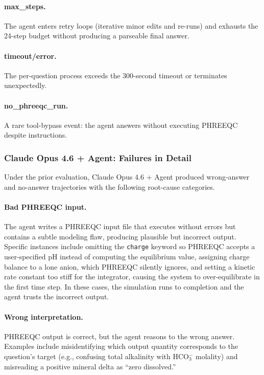 \documentclass{article}
\begin{document}
\paragraph{max\_steps.}
The agent enters retry loops (iterative minor edits and re-runs) and exhausts the 24-step budget without producing a parseable final answer.

\paragraph{timeout/error.}
The per-question process exceeds the 300-second timeout or terminates unexpectedly.

\paragraph{no\_phreeqc\_run.}
A rare tool-bypass event: the agent answers without executing PHREEQC despite instructions.

\subsubsection{Claude Opus 4.6 + Agent: Failures in Detail}

Under the prior evaluation, Claude Opus 4.6 + Agent produced wrong-answer and no-answer trajectories with the following root-cause categories.

\paragraph{Bad PHREEQC input.}
The agent writes a PHREEQC input file that executes without errors but contains a subtle modeling flaw, producing plausible but incorrect output. Specific instances include omitting the \texttt{charge} keyword so PHREEQC accepts a user-specified pH instead of computing the equilibrium value, assigning charge balance to a lone anion, which PHREEQC silently ignores, and setting a kinetic rate constant too stiff for the integrator, causing the system to over-equilibrate in the first time step. In these cases, the simulation runs to completion and the agent trusts the incorrect output.

\paragraph{Wrong interpretation.}
PHREEQC output is correct, but the agent reasons to the wrong answer. Examples include misidentifying which output quantity corresponds to the question's target (e.g., confusing total alkalinity with HCO$_3^-$ molality) and misreading a positive mineral delta as ``zero dissolved.''
\end{document}
